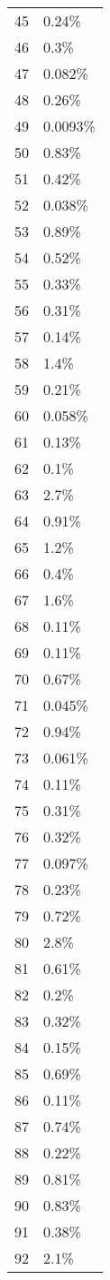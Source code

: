 \begin{longtable}[]{@{}ll@{}}
45 & 0.24\% \\
46 & 0.3\% \\
47 & 0.082\% \\
48 & 0.26\% \\
49 & 0.0093\% \\
50 & 0.83\% \\
51 & 0.42\% \\
52 & 0.038\% \\
53 & 0.89\% \\
54 & 0.52\% \\
55 & 0.33\% \\
56 & 0.31\% \\
57 & 0.14\% \\
58 & 1.4\% \\
59 & 0.21\% \\
60 & 0.058\% \\
61 & 0.13\% \\
62 & 0.1\% \\
63 & 2.7\% \\
64 & 0.91\% \\
65 & 1.2\% \\
66 & 0.4\% \\
67 & 1.6\% \\
68 & 0.11\% \\
69 & 0.11\% \\
70 & 0.67\% \\
71 & 0.045\% \\
72 & 0.94\% \\
73 & 0.061\% \\
74 & 0.11\% \\
75 & 0.31\% \\
76 & 0.32\% \\
77 & 0.097\% \\
78 & 0.23\% \\
79 & 0.72\% \\
80 & 2.8\% \\
81 & 0.61\% \\
82 & 0.2\% \\
83 & 0.32\% \\
84 & 0.15\% \\
85 & 0.69\% \\
86 & 0.11\% \\
87 & 0.74\% \\
88 & 0.22\% \\
89 & 0.81\% \\
90 & 0.83\% \\
91 & 0.38\% \\
92 & 2.1\% \\

\end{longtable}
